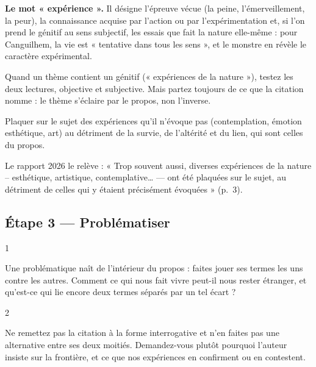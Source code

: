 \documentclass[11pt,a4paper]{article}
\begin{document}
\textbf{Le mot « expérience ».} Il désigne l'épreuve vécue (la peine, l'émerveillement, la peur), la connaissance acquise par l'action ou par l'expérimentation et, si l'on prend le génitif au sens subjectif, les essais que fait la nature elle-même : pour Canguilhem, la vie est « tentative dans tous les sens », et le monstre en révèle le caractère expérimental.

\begin{methode}

Quand un thème contient un génitif (« expériences de la nature »), testez les deux lectures, objective et subjective. Mais partez toujours de ce que la citation nomme : le thème s'éclaire par le propos, non l'inverse.

\end{methode}

\begin{piege}

Plaquer sur le sujet des expériences qu'il n'évoque pas (contemplation, émotion esthétique, art) au détriment de la survie, de l'altérité et du lien, qui sont celles du propos.

\end{piege}

\begin{jury}

Le rapport 2026 le relève : « Trop souvent aussi, diverses expériences de la nature -- esthétique, artistique, contemplative\ldots{} --- ont été plaquées sur le sujet, au détriment de celles qui y étaient précisément évoquées » (p.~3).

\end{jury}

\hypertarget{uxe9tape-3-probluxe9matiser}{%
\subsection{Étape 3 --- Problématiser}\label{uxe9tape-3-probluxe9matiser}}

\begin{indication}{1}

Une problématique naît de l'intérieur du propos : faites jouer ses termes les uns contre les autres. Comment ce qui nous fait vivre peut-il nous rester étranger, et qu'est-ce qui lie encore deux termes séparés par un tel écart ?

\end{indication}

\begin{indication}{2}

Ne remettez pas la citation à la forme interrogative et n'en faites pas une alternative entre ses deux moitiés. Demandez-vous plutôt pourquoi l'auteur insiste sur la frontière, et ce que nos expériences en confirment ou en contestent.

\end{indication}
\end{document}
